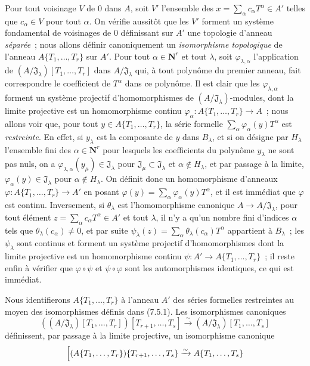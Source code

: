 \begin{env}[7.5.1]
Pour tout voisinage $V$ de $0$ dans $A$, soit $V'$ l'ensemble des
$x=\sum_\alpha c_\alpha T^\alpha\in A'$ telles que $c_\alpha\in V$ pour tout
$\alpha$. On vérifie aussitôt que les $V'$ forment un système fondamental de
voisinages de $0$ définissant sur $A'$ une topologie d'anneau \emph{séparée}~;
nous allons définir canoniquement un \emph{isomorphisme topologique} de
l'anneau $A\{T_1,\ldots,T_r\}$ sur $A'$. Pour tout
$\alpha\in\mathbf{N}^r$ et tout $\lambda$, soit
$\varphi_{\lambda,\alpha}$ l'application de
$(A/\mathfrak J_\lambda)[T_1,\ldots,T_r]$ dans
$A/\mathfrak J_\lambda$ qui, à tout polynôme du premier anneau, fait
correspondre le coefficient de $T^\alpha$ dans ce polynôme. Il est clair que
les $\varphi_{\lambda,\alpha}$ forment un système projectif d'homomorphismes
de $(A/\mathfrak J_\lambda)$-modules, dont la limite projective est un
homomorphisme continu
$\varphi_\alpha:A\{T_1,\ldots,T_r\}\to A$~; nous allons voir que, pour tout
$y\in A\{T_1,\ldots,T_r\}$, la série formelle
$\sum_\alpha\varphi_\alpha(y)T^\alpha$ est \emph{restreinte}. En effet, si
$y_\lambda$ est la composante de $y$ dans $B_\lambda$, et si on désigne par
$H_\lambda$ l'ensemble fini des $\alpha\in\mathbf{N}^r$ pour lesquels les
coefficients du polynôme $y_\lambda$ ne sont pas nuls, on a
$\varphi_{\lambda,\alpha}(y_\mu)\in\mathfrak J_\lambda$ pour
$\mathfrak J_\mu\subset\mathfrak J_\lambda$ et $\alpha\notin H_\lambda$, et
par passage à la limite, $\varphi_\alpha(y)\in\mathfrak J_\lambda$ pour
$\alpha\notin H_\lambda$. On définit donc un homomorphisme d'anneaux
$\varphi:A\{T_1,\ldots,T_r\}\to A'$ en posant
$\varphi(y)=\sum_\alpha\varphi_\alpha(y)T^\alpha$, et il est immédiat que
$\varphi$ est continu. Inversement, si $\theta_\lambda$ est l'homomorphisme
canonique $A\to A/\mathfrak J_\lambda$, pour tout élément
$z=\sum_\alpha c_\alpha T^\alpha\in A'$ et tout $\lambda$, il n'y a qu'un
nombre fini d'indices $\alpha$ tels que $\theta_\lambda(c_\alpha)\neq0$, et
par suite
$\psi_\lambda(z)=\sum_\alpha\theta_\lambda(c_\alpha)T^\alpha$ appartient à
$B_\lambda$~; les $\psi_\lambda$ sont continus et forment un système
projectif d'homomorphismes dont la limite projective est un homomorphisme
continu $\psi:A'\to A\{T_1,\ldots,T_r\}$~; il reste enfin à vérifier que
$\varphi\circ\psi$ et $\psi\circ\varphi$ sont les automorphismes identiques,
ce qui est immédiat.
\end{env}

\begin{env}[7.5.2]
\label{0.7.5.2-fr}
Nous identifierons $A\{T_1,\ldots,T_r\}$ à l'anneau $A'$ des séries formelles
restreintes au moyen des isomorphismes définis dans (7.5.1). Les isomorphismes
canoniques
\[
  ((A/\mathfrak J_\lambda)[T_1,\ldots,T_r])
  [T_{r+1},\ldots,T_s]
  \xrightarrow{\sim}
  (A/\mathfrak J_\lambda)[T_1,\ldots,T_s]
\]
définissent, par passage à la limite projective, un isomorphisme canonique
\[
  \Bigl[(A\{T_1,\ldots,T_r\})\{T_{r+1},\ldots,T_s\}
  \xrightarrow{\sim}
  A\{T_1,\ldots,T_s\}
\]
\end{env}

